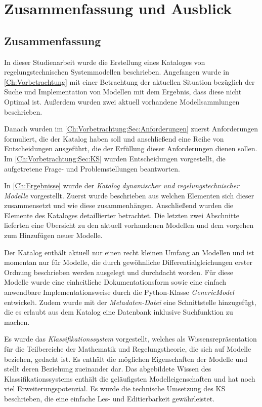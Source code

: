 \chapter{Zusammenfassung und Ausblick}
\section{Zusammenfassung} 
In dieser Studienarbeit wurde die Erstellung eines Kataloges von regelungstechnischen Systemmodellen beschrieben. Angefangen wurde in \autoref{Ch:Vorbetrachtung} mit einer Betrachtung der aktuellen Situation bezüglich der Suche und Implementation von Modellen mit dem Ergebnis, dass diese nicht Optimal ist. Außerdem wurden zwei aktuell vorhandene Modellsammlungen beschrieben. 

Danach wurden im \autoref{Ch:Vorbetrachtung:Sec:Anforderungen} zuerst Anforderungen formuliert, die der Katalog haben soll und anschließend eine Reihe von Entscheidungen ausgeführt, die der Erfüllung dieser Anforderungen dienen sollen. Im \autoref{Ch:Vorbetrachtung:Sec:KS} wurden Entscheidungen vorgestellt, die aufgetretene Frage- und Problemstellungen beantworten.

In \autoref{Ch:Ergebnisse} wurde der \textit{Katalog dynamischer und regelungstechnischer Modelle} vorgestellt. Zuerst wurde beschrieben aus welchen Elementen sich dieser zusammensetzt und wie diese zusammenhängen. Anschließend wurden die Elemente des Kataloges detaillierter betrachtet. Die letzten zwei Abschnitte lieferten eine Übersicht zu den aktuell vorhandenen Modellen und dem vorgehen zum Hinzufügen neuer Modelle.

Der Katalog enthält aktuell nur einen recht kleinen Umfang an Modellen und ist momentan nur für Modelle, die durch gewöhnliche Differentialgleichungen erster Ordnung beschrieben werden ausgelegt und durchdacht worden. Für diese Modelle wurde eine einheitliche Dokumentationsform sowie eine einfach anwendbare Implementationsweise durch die Python-Klasse \textit{GenericModel} entwickelt. Zudem wurde mit der \textit{Metadaten-Datei} eine Schnittstelle hinzugefügt, die es erlaubt aus dem Katalog eine Datenbank inklusive Suchfunktion zu machen. 

Es wurde das \textit{Klassifikationssystem} vorgestellt, welches als Wissensrepräsentation für die Teilbereiche der Mathematik und Regelungstheorie, die sich auf Modelle beziehen, gedacht ist. Es enthält die möglichen Eigenschaften der Modelle und stellt deren Beziehung zueinander dar. Das abgebildete Wissen des Klassifikationssystems enthält die geläufigsten Modelleigenschaften und hat noch viel Erweiterungspotenzial. Es wurde die technische Umsetzung des KS beschrieben, die eine einfache Les- und Editierbarkeit gewährleistet. 

